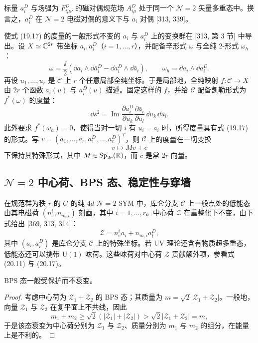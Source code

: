 \begin{proposition}[19.33]
标量 $a^D_i$ 与场强为 $F^D_{i\mu\nu}$ 的磁对偶规范场 $A^D_{i\mu}$ 处于同一个 $\mathcal{N}=2$ 矢量多重态中。换言之，$a^D_i$ 在 $\mathcal{N}=2$ 电磁对偶的意义下与 $a_i$ 对偶 [313, 339]。
\end{proposition}

使式 (19.17) 的度量的一般形式不变的 $a_i$ 与 $a^D_i$ 上的变换群在 [313, 第 3 节] 中导出。设 $X\simeq\mathbb{C}^{2r}$ 带坐标 $a_i,a^D_i$（$i=1,\dots,r$），并配备辛形式 $\omega$ 与全纯 2-形式 $\omega_h$：
\[
\omega=\frac{\ii}{2}\left(\dd a_i\wedge \dd\bar a^D_i-\dd a^D_i\wedge \dd\bar a_i\right),
\qquad
\omega_h=\dd a_i\wedge \dd a^D_i.
\]
再设 $u_1,\dots,u_r$ 是 $\mathcal{C}$ 上 $r$ 个任意局部全纯坐标。于是局部地，全纯映射 $f\colon\mathcal{C}\to X$ 由 $2r$ 个函数 $a_i(u)$ 与 $a^D_i(u)$ 描述。固定这样的 $f$，并给 $\mathcal{C}$ 配备凯勒形式为 $f^*(\omega)$ 的度量：
\[
\dd s^2=\operatorname{Im}\frac{\partial a^D_i}{\partial u_k}\frac{\partial\bar a_i}{\partial\bar u_l}\,\dd u_k\,\dd\bar u_l.
\]
此外要求 $f^*(\omega_h)=0$，使得当对一切 $i$ 有 $u_i=a_i$ 时，所得度量具有式 (19.17) 的形式。写 $v=(a_1,\dots,a_r,a^D_1,\dots,a^D_r)^T$，则 $\mathcal{C}$ 上的度量在一切变换
\begin{equation}
v\longmapsto Mv+c \tag{19.20}
\end{equation}
下保持其特殊形式，其中 $M\in\operatorname{Sp}_{2r}(\mathbb{R})$，而 $c$ 是常 $2r$-向量。


\subsection{$\mathcal{N}=2$ 中心荷、BPS 态、稳定性与穿墙}

在规范群为秩 $r$ 的 $G$ 的纯 $4d$ $\mathcal{N}=2$ SYM 中，库仑分支 $\mathcal{C}$ 上一般点处的低能态由其电磁荷 $(n^i_e,n_{m,i})$ 刻画，其中 $i=1,\dots,r$。中心荷 $\mathcal{Z}$ 在重整化下不变，由下式给出 [369, 313, 314]：
\[
\mathcal{Z}=n^i_e a_i+n_{m,i}a^D_i,
\]
其中 $(a_i,a^D_i)$ 是库仑分支 $\mathcal{C}$ 上的特殊坐标。若 UV 理论还含有物质超多重态，低能态还可以携带 $\mathrm{U}(1)$ 味荷。这些味荷对中心荷 $\mathcal{Z}$ 贡献额外项，参看式 (20.11) 与 (20.17)。

\begin{proposition}[19.34]
BPS 态一般受保护而不衰变。
\end{proposition}

\begin{proof}
考虑中心荷为 $\mathcal{Z}_1+\mathcal{Z}_2$ 的 BPS 态；其质量为 $m=\sqrt{2}|\mathcal{Z}_1+\mathcal{Z}_2|$。一般地，向量 $\mathcal{Z}_1$ 与 $\mathcal{Z}_2$ 在复平面上不共线，因此
\begin{equation}
m_1+m_2\ge\sqrt{2}\left(|\mathcal{Z}_1|+|\mathcal{Z}_2|\right)>\sqrt{2}|\mathcal{Z}_1+\mathcal{Z}_2|=m, \tag{19.21}
\end{equation}
于是该态衰变为中心荷分别为 $\mathcal{Z}_1$ 与 $\mathcal{Z}_2$、质量分别为 $m_1$ 与 $m_2$ 的组分，在能量上是不利的。
\end{proof}

